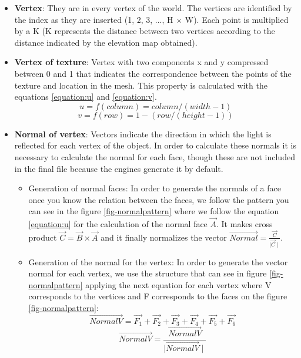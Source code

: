 \documentclass[10pt,a4paper,twocolumn,twoside]{article}
\begin{document}
\begin{itemize}
\setlength\itemsep{0em}
  \item \textbf{Vertex}: They are in every vertex of the world. The vertices are identified by the index as they are inserted (1, 2, 3, ..., H $\times$ W). Each point is multiplied by a K (K represents the distance between two vertices according to the distance indicated by the elevation map obtained).

  \item {
    \textbf{Vertex of texture}: Vertex with two components x and y compressed between 0 and 1 that indicates the correspondence between the points of the texture and location in the mesh. This property is calculated with the equations \ref{equation:u} and \ref{equation:v}.
    \begin{equation}
    \label{equation:u}
    u = f(column) = column / (width - 1)
    \end{equation}
    \begin{equation}
    \label{equation:v}
    v = f(row) = 1 - (row / (height - 1))
    \end{equation}
  }

\vspace{-0.5cm}
  \item \textbf{Normal of vertex}: Vectors indicate the direction in which the light is reflected for each vertex of the object. In order to calculate these normals it is necessary to calculate the normal for each face, though these are not included in the final file because the engines generate it by default.

  \begin{itemize}
  \setlength\itemsep{0em}
    \item {
      Generation of normal faces: In order to generate the normals of a face once you know the relation between the faces, we follow the pattern you can see in the figure \ref{fig-normalpattern} where we follow the equation \ref{equation:u} for the calculation of the normal face $\vec{A}$. It makes cross product $\vec{C} = \vec{B}\times\vec{A}$ and it finally normalizes the vector $\vec{Normal} = \frac{\vec{C}}{\mid\vec{C}\mid}$.
    }

    \item {
    Generation of the normal for the vertex: In order to generate the vector normal for each vertex, we use the structure that can see in figure \ref{fig-normalpattern} applying the next equation for each vertex where V corresponds to the vertices and F corresponds to the faces on the figure \ref{fig-normalpattern}:
      \begin{equation}
      \vec{NormalV} = \vec{F_1} + \vec{F_2} + \vec{F_3} + \vec{F_4} + \vec{F_5} + \vec{F_6}
      \end{equation}
      \begin{equation}
      \vec{NormalV} = \frac{\vec{NormalV}}{\mid\vec{NormalV}\mid}
      \end{equation}
    }
  \end{itemize}


\end{itemize}
\end{document}
